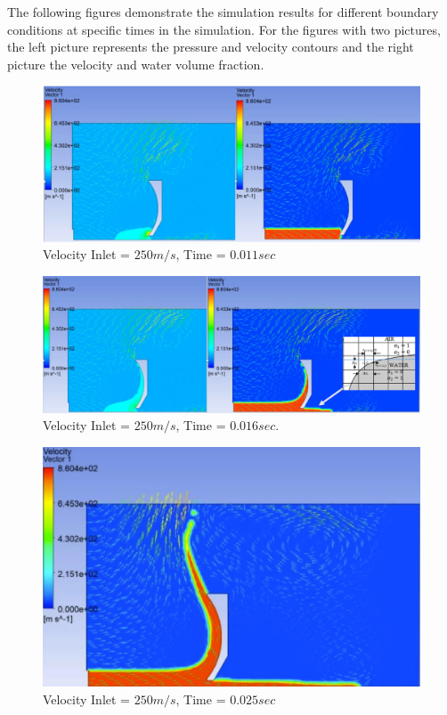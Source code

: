 The following figures demonstrate the simulation results for different boundary conditions at specific times in the simulation. For the figures with two pictures, the left picture represents the pressure and velocity contours and the right picture the velocity and water volume fraction.

\begin{figure}[H] \label{fig:fluid_sim1} \centering
    \includegraphics[width=\linewidth]{figures/fluid_sim1.png}
    \caption{Velocity Inlet = $250 m/s$, Time = $0.011sec$}
\end{figure}

\begin{figure}[H] \label{fig:fluid_sim3} \centering
    \includegraphics[width=\linewidth]{figures/fluid_sim3.png}
    \caption{Velocity Inlet = $250 m/s$, Time = $0.016sec$.}
\end{figure}

\begin{figure}[H] \label{fig:fluid_sim2} \centering
    \includegraphics[width=\linewidth]{figures/fluid_sim2.png}
    \caption{Velocity Inlet = $250 m/s$, Time = $0.025sec$}
\end{figure}

